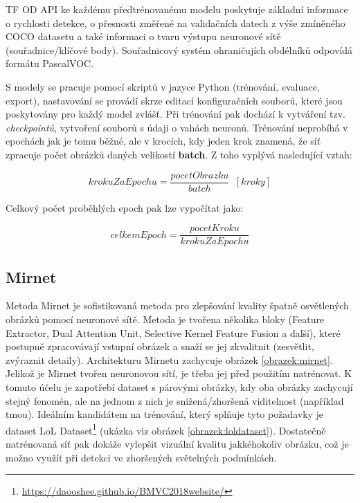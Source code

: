 TF OD API ke každému předtrénovanému modelu poskytuje základní informace o rychlosti detekce, o přesnosti změřené na validačních datech z výše zmíněného COCO datasetu a také informaci o tvaru výstupu neuronové sítě (souřadnice/klíčové body). Souřadnicový systém ohraničujích obdélníků odpovídá formátu PascalVOC. 

S modely se pracuje pomocí skriptů v jazyce Python (trénování, evaluace, export), nastavování se provádí skrze editaci konfiguračních souborů, které jsou poskytovány pro každý model zvlášť. Při trénování pak dochází k vytváření tzv. \emph{checkpointů}, vytvoření souborů s údaji o vahách neuronů. Trénování neprobíhá v epochách jak je tomu běžné, ale v krocích, kdy jeden krok znamená, že síť zpracuje počet obrázků daných velikostí \textbf{batch}. Z toho vyplývá nasledující vztah:

\begin{equation}
  \label{vzorec:krokuzaepochu}
  krokuZaEpochu = \frac{pocetObrazku}{batch}  \;\;[kroky]  
\end{equation}

\noindent Celkový počet proběhlých epoch pak lze vypočítat jako:

\begin{equation}
  \label{vzorec:celkemepoch}
  celkemEpoch = \frac{pocetKroku}{krokuZaEpochu}
\end{equation}


\subsection*{Mirnet}
Metoda Mirnet\cite{mirnet} je sofistikovaná metoda pro zlepšování kvality špatně osvětlených obrázků pomocí neuronové sítě. Metoda je tvořena několika bloky (Feature Extractor, Dual Attention Unit, Selective Kernel Feature Fusion a další), které postupně zpracovávají vstupní obrázek a snaží se jej zkvalitnit (zesvětlit, zvýraznit detaily). Architekturu Mirnetu zachycuje obrázek \ref{obrazek:mirnet}. Jelikož je Mirnet tvořen neuronovou sítí, je třeba jej před použitím natrénovat. K tomuto účelu je zapotřebí dataset s párovými obrázky, kdy oba obrázky zachycují stejný fenomén, ale na jednom z nich je snížená/zhoršená viditelnost (například tmou). Ideálním kandidátem na trénování, který splňuje tyto požadavky je dataset LoL Dataset\footnote{\url{https://daooshee.github.io/BMVC2018website/}} (ukázka viz obrázek \ref{obrazek:loldataset}). Dostatečně natrénovaná síť pak dokáže vylepšit vizuální kvalitu jakkéhokoliv obrázku, což je možno využít při detekci ve zhoršených světelných podmínkách.

